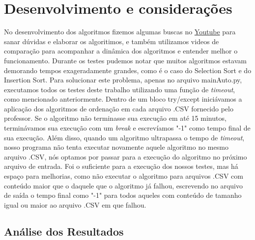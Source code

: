 \documentclass[a4paper,12pt]{scrartcl}
\begin{document}
\section{Desenvolvimento e considerações}
No desenvolvimento dos algoritmos fizemos algumas buscas no \href{https://www.youtube.com/}{Youtube} para sanar dúvidas e elaborar os algoritimos, e também utilizamos videos de comparação para acompanhar a dinâmica dos algoritmos e entender melhor o funcionamento. Durante os testes pudemos notar que muitos algoritmos estavam demorando tempos exageradamente grandes, como é o caso do Selection Sort e do Insertion Sort. Para solucionar este problema, apenas no arquivo mainAuto.py, executamos todos os testes deste trabalho utilizando uma função de \textit{timeout}, como mencionado anteriormente. Dentro de um bloco try/except iniciávamos a aplicação dos algoritmos de ordenação em cada arquivo .CSV fornecido pelo professor. Se o algoritmo não terminasse sua execução em até 15 minutos, terminávamos sua execução com um \textit{break} e escrevíamos "-1" como tempo final de sua execução. Além disso, quando um algoritmo ultrapassa o tempo de \textit{timeout}, nosso programa não tenta executar novamente aquele algoritmo no mesmo arquivo .CSV, nós optamos por passar para a execução do algoritmo no próximo arquivo de entrada. Foi o suficiente para a execução dos nossos testes, mas há espaço para melhorias, como não executar o algoritmo para arquivos .CSV com conteúdo maior que o daquele que o algoritmo já falhou, escrevendo no arquivo de saída o tempo final como "-1" para todos aqueles com conteúdo de tamanho igual ou maior ao arquivo .CSV em que falhou.

\subsection{Análise dos Resultados}
\end{document}
